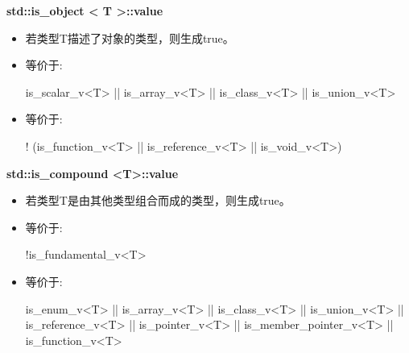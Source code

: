 \textbf{std::is\_object < T >::value}

\begin{itemize}
\item 
若类型T描述了对象的类型，则生成true。

\item 
等价于: 
\begin{cpp}
is_scalar_v<T> || is_array_v<T> || is_class_v<T> || is_union_v<T>
\end{cpp}

\item
等价于: 
\begin{cpp}
! (is_function_v<T> || is_reference_v<T> || is_void_v<T>)
\end{cpp}
\end{itemize}

\textbf{std::is\_compound <T>::value}

\begin{itemize}
\item 
若类型T是由其他类型组合而成的类型，则生成true。

\item 
等价于: 
\begin{cpp}
!is_fundamental_v<T>
\end{cpp}

\item
等价于: 
\begin{cpp}
is_enum_v<T> || is_array_v<T> || is_class_v<T> || is_union_v<T>
|| is_reference_v<T> || is_pointer_v<T> || is_member_pointer_v<T>
|| is_function_v<T>
\end{cpp}
\end{itemize}



